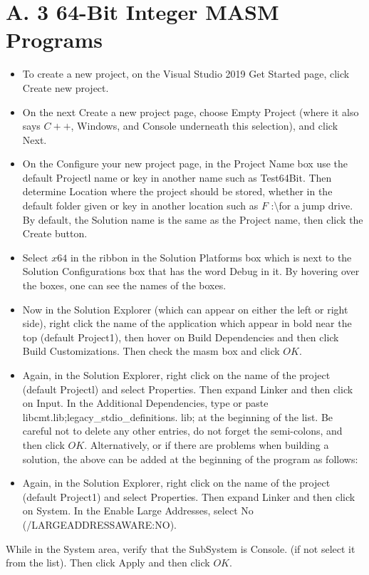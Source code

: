 \documentclass[10pt]{article}
\begin{document}
\section*{A. 3 64-Bit Integer MASM Programs}
\begin{itemize}
  \item To create a new project, on the Visual Studio 2019 Get Started page, click Create new project.
  \item On the next Create a new project page, choose Empty Project (where it also says $C++$, Windows, and Console underneath this selection), and click Next.
  \item On the Configure your new project page, in the Project Name box use the default Projectl name or key in another name such as Test64Bit. Then determine Location where the project should be stored, whether in the default folder given or key in another location such as $F$ :\textbackslash for a jump drive. By default, the Solution name is the same as the Project name, then click the Create button.
  \item Select $x 64$ in the ribbon in the Solution Platforms box which is next to the Solution Configurations box that has the word Debug in it. By hovering over the boxes, one can see the names of the boxes.
  \item Now in the Solution Explorer (which can appear on either the left or right side), right click the name of the application which appear in bold near the top (default Project1), then hover on Build Dependencies and then click Build Customizations. Then check the masm box and click $O K$.
  \item Again, in the Solution Explorer, right click on the name of the project (default Projectl) and select Properties. Then expand Linker and then click on Input. In the Additional Dependencies, type or paste libcmt.lib;legacy\_stdio\_definitions. lib; at the beginning of the list. Be careful not to delete any other entries, do not forget the semi-colons, and then click $O K$. Alternatively, or if there are problems when building a solution, the above can be added at the beginning of the program as follows:
  \item Again, in the Solution Explorer, right click on the name of the project (default Project1) and select Properties. Then expand Linker and then click on System. In the Enable Large Addresses, select No (/LARGEADDRESSAWARE:NO).
\end{itemize}

While in the System area, verify that the SubSystem is Console. (if not select it from the list). Then click Apply and then click $O K$.
\end{document}
